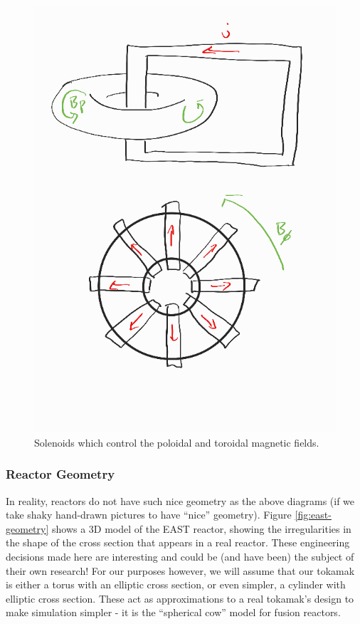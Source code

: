 \begin{figure}[h!]
    \centering
    \includegraphics[scale=0.5]{imgs/c1/solenoids.png}
    \caption{Solenoids which control the poloidal and toroidal magnetic fields.}
    \label{solenoids}
\end{figure}\newpage

\subsubsection{Reactor Geometry}
In reality, reactors do not have such nice geometry as the above diagrams (if we take shaky hand-drawn pictures to have ``nice'' geometry). Figure \ref{fig:east-geometry}
shows a 3D model of the EAST reactor, showing the irregularities in the shape of the cross section that appears in a real reactor. These 
engineering decisions made here are interesting and could be (and have been) the subject of their own research! For our purposes however, we will 
assume that our tokamak is either a torus with an elliptic cross section, or even simpler, a cylinder with elliptic cross section. These act 
as approximations to a real tokamak's design to make simulation simpler - it is the ``spherical cow'' model for fusion reactors.

